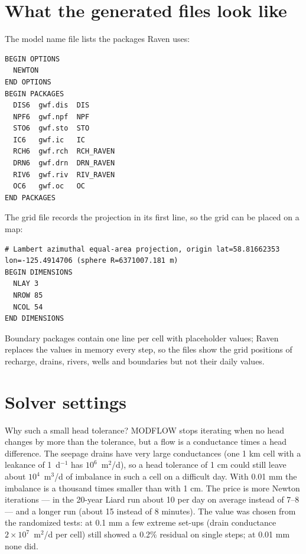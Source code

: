\section{What the generated files look like}
The model name file lists the packages Raven uses:
\begin{lstlisting}
BEGIN OPTIONS
  NEWTON
END OPTIONS
BEGIN PACKAGES
  DIS6  gwf.dis  DIS
  NPF6  gwf.npf  NPF
  STO6  gwf.sto  STO
  IC6   gwf.ic   IC
  RCH6  gwf.rch  RCH_RAVEN
  DRN6  gwf.drn  DRN_RAVEN
  RIV6  gwf.riv  RIV_RAVEN
  OC6   gwf.oc   OC
END PACKAGES
\end{lstlisting}
The grid file records the projection in its first line, so the grid can be placed on a map:
\par\noindent\begin{minipage}{\linewidth}
\begin{lstlisting}
# Lambert azimuthal equal-area projection, origin lat=58.81662353 lon=-125.4914706 (sphere R=6371007.181 m)
BEGIN DIMENSIONS
  NLAY 3
  NROW 85
  NCOL 54
END DIMENSIONS
\end{lstlisting}
\end{minipage}\par\smallskip
Boundary packages contain one line per cell with placeholder values; Raven replaces the values in memory every step, so
the files show the grid positions of recharge, drains, rivers, wells and boundaries but not their daily values.

\section{Solver settings}
Why such a small head tolerance? MODFLOW stops iterating when no head changes by more than the tolerance, but a flow is a
conductance times a head difference. The seepage drains have very large conductances (one 1 km cell with a leakance of
1~d$^{-1}$ has $10^6$~m$^2$/d), so a head tolerance of 1 cm could still leave about $10^4$~m$^3$/d of imbalance in such a cell on a
difficult day. With 0.01 mm the imbalance is a thousand times smaller than with 1 cm. The price is more Newton iterations --- in the
20-year Liard run about 10 per day on average instead of 7--8 --- and a longer run (about 15 instead of 8 minutes). The value was chosen from the
randomized tests: at 0.1 mm a few extreme set-ups (drain conductance $2\times10^7$~m$^2$/d per cell) still showed a 0.2\%
residual on single steps; at 0.01 mm none did.

